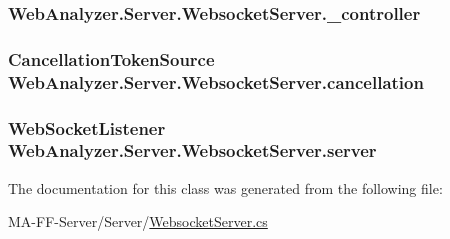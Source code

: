 \subsubsection[{\+\_\+controller}]{ Web\+Analyzer.\+Server.\+Websocket\+Server.\+\_\+controller\hspace{0.3cm}{\ttfamily [private]}}\label{class_web_analyzer_1_1_server_1_1_websocket_server_ae9083f25b4a1b713998b19eb68e35d6e}
\hypertarget{class_web_analyzer_1_1_server_1_1_websocket_server_ac6ff75e9f3bc2200953d755b029e5344}{}
\subsubsection[{cancellation}]{\setlength{\rightskip}{0pt plus 5cm}Cancellation\+Token\+Source Web\+Analyzer.\+Server.\+Websocket\+Server.\+cancellation\hspace{0.3cm}{\ttfamily [private]}}\label{class_web_analyzer_1_1_server_1_1_websocket_server_ac6ff75e9f3bc2200953d755b029e5344}
\hypertarget{class_web_analyzer_1_1_server_1_1_websocket_server_abc42c992699d787cfdcb33f9e51140b4}{}
\subsubsection[{server}]{\setlength{\rightskip}{0pt plus 5cm}Web\+Socket\+Listener Web\+Analyzer.\+Server.\+Websocket\+Server.\+server\hspace{0.3cm}{\ttfamily [private]}}\label{class_web_analyzer_1_1_server_1_1_websocket_server_abc42c992699d787cfdcb33f9e51140b4}


The documentation for this class was generated from the following file\+:\begin{DoxyCompactItemize}
\item 
M\+A-\/\+F\+F-\/\+Server/\+Server/\hyperlink{_websocket_server_8cs}{Websocket\+Server.\+cs}\end{DoxyCompactItemize}

